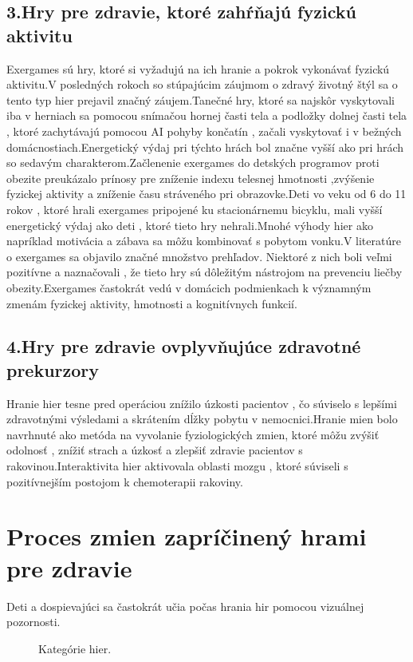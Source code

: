 \documentclass[10pt,twoside,slovak,a4paper]{coursepaper}
\begin{document}
\subsection{3.Hry pre zdravie, ktoré zahŕňajú fyzickú aktivitu}
Exergames sú hry, ktoré si vyžadujú na ich hranie a pokrok vykonávať fyzickú aktivitu.V posledných rokoch so stúpajúcim záujmom o zdravý životný štýl sa o tento typ hier prejavil značný záujem.Tanečné hry, ktoré sa najskôr vyskytovali iba v herniach sa pomocou snímačou hornej časti tela a podložky dolnej časti tela , ktoré zachytávajú pomocou AI pohyby končatín , začali vyskytovať i v bežných domácnostiach.Energetický výdaj pri týchto hrách bol značne vyšší ako pri hrách so sedavým charakterom.Začlenenie exergames do detských programov proti obezite preukázalo prínosy pre zníženie indexu telesnej hmotnosti ,zvýšenie fyzickej aktivity a zníženie času stráveného pri obrazovke.Deti vo veku od 6 do 11 rokov , ktoré hrali exergames pripojené ku stacionárnemu bicyklu, mali vyšší energetický výdaj ako deti , ktoré tieto hry nehrali.Mnohé výhody hier ako napríklad motivácia a zábava sa môžu kombinovať s pobytom vonku.V literatúre o exergames sa objavilo značné množstvo prehľadov. Niektoré z nich boli veľmi pozitívne a naznačovali , že tieto hry sú dôležitým nástrojom na prevenciu liečby obezity.Exergames častokrát vedú v domácich podmienkach k významným zmenám fyzickej aktivity, hmotnosti a kognitívnych funkcií.
\subsection{4.Hry pre zdravie ovplyvňujúce zdravotné prekurzory}
Hranie hier tesne pred operáciou znížilo úzkosti pacientov , čo súviselo s lepšími zdravotnými výsledami a skrátením dĺžky pobytu v nemocnici.Hranie mien bolo navrhnuté ako metóda na vyvolanie fyziologických zmien, ktoré môžu zvýšiť odolnosť , znížiť strach a úzkosť a zlepšiť zdravie pacientov s rakovinou.Interaktivita hier aktivovala oblasti mozgu , ktoré súviseli s pozitívnejším postojom k chemoterapii rakoviny.
\section{Proces zmien zapríčinený hrami pre zdravie}
Deti a dospievajúci sa častokrát učia počas hrania hir pomocou vizuálnej pozornosti.
\begin{figure}[tbh]
\centering
\caption{Kategórie hier.}
\label{f:rozhod}
\end{figure}
\end{document}

